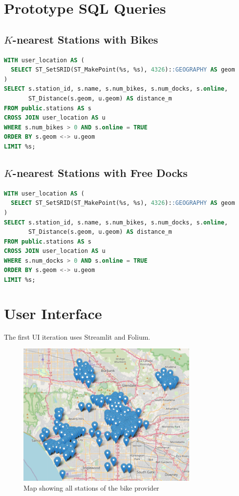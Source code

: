 \documentclass{article}
\begin{document}
\section{Prototype SQL Queries}

\subsection{$K$-nearest Stations with Bikes}
\begin{lstlisting}[language=SQL]
WITH user_location AS (
  SELECT ST_SetSRID(ST_MakePoint(%s, %s), 4326)::GEOGRAPHY AS geom
)
SELECT s.station_id, s.name, s.num_bikes, s.num_docks, s.online,
       ST_Distance(s.geom, u.geom) AS distance_m
FROM public.stations AS s
CROSS JOIN user_location AS u
WHERE s.num_bikes > 0 AND s.online = TRUE
ORDER BY s.geom <-> u.geom
LIMIT %s;
\end{lstlisting}

\subsection{$K$-nearest Stations with Free Docks}
\begin{lstlisting}[language=SQL]
WITH user_location AS (
  SELECT ST_SetSRID(ST_MakePoint(%s, %s), 4326)::GEOGRAPHY AS geom
)
SELECT s.station_id, s.name, s.num_bikes, s.num_docks, s.online,
       ST_Distance(s.geom, u.geom) AS distance_m
FROM public.stations AS s
CROSS JOIN user_location AS u
WHERE s.num_docks > 0 AND s.online = TRUE
ORDER BY s.geom <-> u.geom
LIMIT %s;
\end{lstlisting}

\section{User Interface}
The first UI iteration uses Streamlit and Folium.

\begin{figure}[H]
    \centering
    \includegraphics[width=0.8\textwidth]{FolioMap.png}
    \caption{Map showing all stations of the bike provider}
    \label{fig:map_all_stations}
\end{figure}
\end{document}
